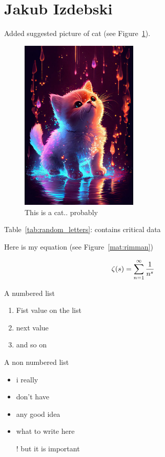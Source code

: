 \section{Jakub Izdebski}
\label{sec:jizdebski}

Added suggested picture of cat (see Figure~\ref{fig:cat}).

\begin{figure}[h]
    \centering
    \includegraphics[width=0.5\textwidth]{pictures/cat.jpg}
    \caption{This is a cat.. probably}
    \label{fig:cat}
\end{figure}

\newpage

Table~\ref{tab:random_letters}: contains critical data



Here is my equation (see Figure~\ref{mat:rimman})

\begin{equation}
    \centering
    \zeta(s) = \sum_{n=1}^{\infty}{\frac{1}{n^s}}
    \label{mat:rimman}
\end{equation}

A numbered list 
\begin{enumerate}
    \item Fist value on the list
    \item next value
    \item and so on
\end{enumerate}
\vspace{10pt}
A non numbered list
\begin{itemize}
    \item i really
    \item don't have 
    \item any good idea
    \item what to write here
    \item[!] but it is important
\end{itemize}

